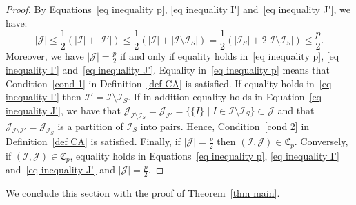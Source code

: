 \documentclass[10pt]{amsart}
\theoremstyle{definition}\newtheorem{defi}[theo]{Definition}\newtheorem{rema}[theo]{Remark}\newtheorem{exam}[theo]{Example}\newtheorem{exem}[theo]{Example}\newtheorem{nota}[theo]{Notation}
\newcommand{\I}{\mathcal{I}}
\newcommand{\J}{\mathcal{J}}
\newcommand{\frkC}{\mathfrak{C}}
\newcommand{\norm}[1]{\left\lvert #1 \right\rvert}
\renewcommand{\leq}{\leqslant}
\begin{document}
\begin{proof}
By Equations~\eqref{eq inequality p}, \eqref{eq inequality I'} and~\eqref{eq inequality J'}, we have:
\begin{equation}\label{eq inequality J}
\norm{\J} \leq \frac{1}{2}\left(\norm{\I}+\norm{\I'}\right) \leq \frac{1}{2}\left(\norm{\I}+\norm{\I \setminus \I_S}\right) = \frac{1}{2}\left(\norm{\I_S} + 2 \norm{\I \setminus \I_S}\right) \leq \frac{p}{2}.
\end{equation}
Moreover, we have $|\J| = \tfrac{p}{2}$ if and only if equality holds in~\eqref{eq inequality p}, \eqref{eq inequality I'} and~\eqref{eq inequality J'}. Equality in~\eqref{eq inequality p} means that Condition~\eqref{cond 1} in Definition~\ref{def CA} is satisfied. If equality holds in~\eqref{eq inequality I'} then $\I' = \I \setminus \I_S$. If in addition equality holds in Equation~\eqref{eq inequality J'}, we have that $\J_{\I \setminus \I_S} = \J_{\I'} = \{\{I\} \mid I \in \I \setminus \I_S\} \subset \J$ and that $\J_{\I \setminus \I'} = \J_{\I_S}$ is a partition of $\I_S$ into pairs. Hence, Condition~\eqref{cond 2} in Definition~\ref{def CA} is satisfied. Finally, if $|\J| = \tfrac{p}{2}$ then $(\I,\J) \in \frkC_p$. Conversely, if $(\I,\J) \in \frkC_p$, equality holds in Equations~\eqref{eq inequality p}, \eqref{eq inequality I'} and~\eqref{eq inequality J'} and $|\J| = \tfrac{p}{2}$.
\end{proof}

We conclude this section with the proof of Theorem~\ref{thm main}.
\end{document}
